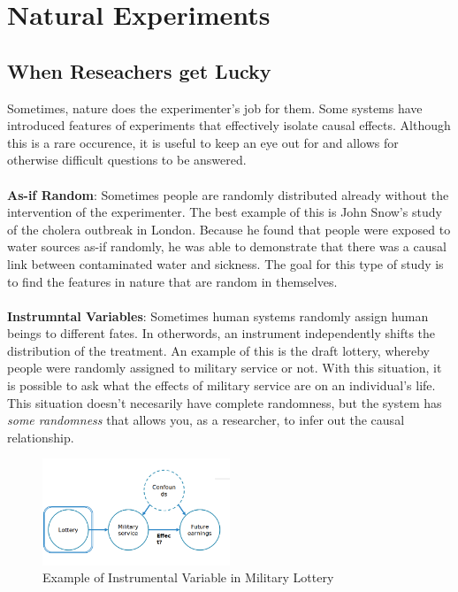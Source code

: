 \section{Natural Experiments}
\subsection{When Reseachers get Lucky}
Sometimes, nature does the experimenter's job for them. Some systems have introduced features of experiments that effectively isolate causal effects. Although this is a rare occurence, it is useful to keep an eye out for and allows for otherwise difficult questions to be answered. \\ \\
\textbf{As-if Random}: Sometimes people are randomly distributed already without the intervention of the experimenter. The best example of this is John Snow's study of the cholera outbreak in London. Because he found that people were exposed to water sources as-if randomly, he was able to demonstrate that there was a causal link between contaminated water and sickness. The goal for this type of study is to find the features in nature that are random in themselves. \\ \\
\textbf{Instrumntal Variables}: Sometimes human systems randomly assign human beings to different fates. In otherwords, an instrument independently shifts the distribution of the treatment. An example of this is the draft lottery, whereby people were randomly assigned to military service or not. With this situation, it is possible to ask what the effects of military service are on an individual's life. This situation doesn't necesarily have complete randomness, but the system has \textit{some randomness} that allows you, as a researcher, to infer out the causal relationship.
\begin{figure}[ht]
  \begin{center}
    \includegraphics[width=0.5\textwidth]{figures/fig2.png}
    \caption{ Example of Instrumental Variable in Military Lottery }
    \label{fig:fig2}
  \end{center}
\end{figure}